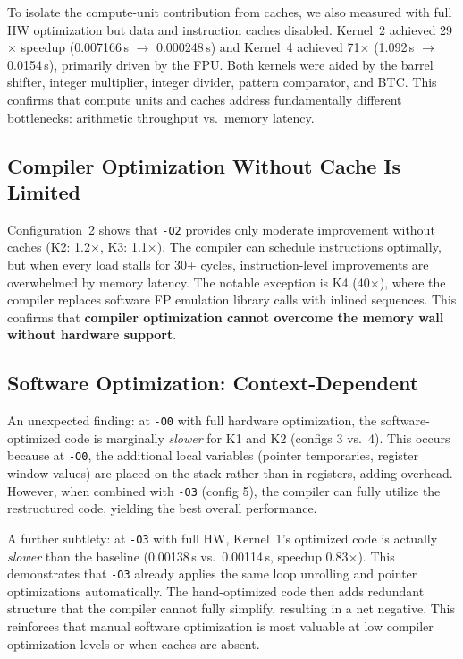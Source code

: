 \documentclass[11pt,a4paper]{article}
\begin{document}
To isolate the compute-unit contribution from caches, we also measured with full HW optimization but data and instruction caches disabled. Kernel~2 achieved 29$\times$ speedup (0.007166\,s $\to$ 0.000248\,s) and Kernel~4 achieved 71$\times$ (1.092\,s $\to$ 0.0154\,s), primarily driven by the FPU. Both kernels were aided by the barrel shifter, integer multiplier, integer divider, pattern comparator, and BTC. This confirms that compute units and caches address fundamentally different bottlenecks: arithmetic throughput vs.\ memory latency.

\subsection{Compiler Optimization Without Cache Is Limited}

Configuration~2 shows that \texttt{-O2} provides only moderate improvement without caches (K2: 1.2$\times$, K3: 1.1$\times$). The compiler can schedule instructions optimally, but when every load stalls for 30+ cycles, instruction-level improvements are overwhelmed by memory latency. The notable exception is K4 (40$\times$), where the compiler replaces software FP emulation library calls with inlined sequences. This confirms that \textbf{compiler optimization cannot overcome the memory wall without hardware support}.

\subsection{Software Optimization: Context-Dependent}

An unexpected finding: at \texttt{-O0} with full hardware optimization, the software-optimized code is marginally \emph{slower} for K1 and K2 (configs 3 vs.\ 4). This occurs because at \texttt{-O0}, the additional local variables (pointer temporaries, register window values) are placed on the stack rather than in registers, adding overhead. However, when combined with \texttt{-O3} (config 5), the compiler can fully utilize the restructured code, yielding the best overall performance.

A further subtlety: at \texttt{-O3} with full HW, Kernel~1's optimized code is actually \emph{slower} than the baseline (0.00138\,s vs.\ 0.00114\,s, speedup 0.83$\times$). This demonstrates that \texttt{-O3} already applies the same loop unrolling and pointer optimizations automatically. The hand-optimized code then adds redundant structure that the compiler cannot fully simplify, resulting in a net negative. This reinforces that manual software optimization is most valuable at low compiler optimization levels or when caches are absent.
\end{document}

